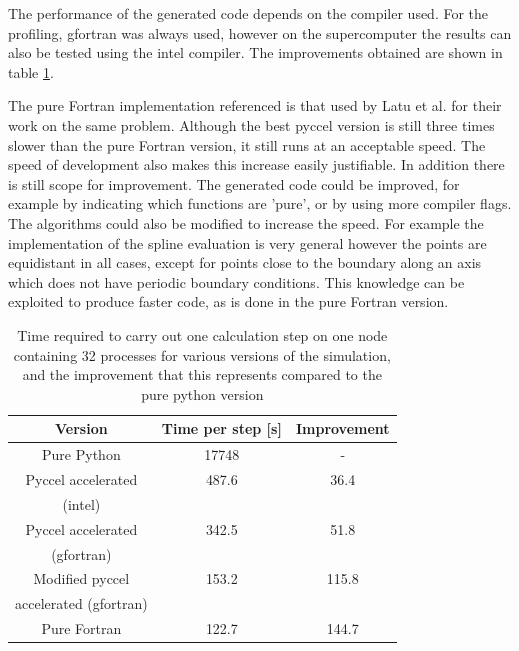 The performance of the generated code depends on the compiler used. For the profiling, gfortran was always used, however on the supercomputer the results can also be tested using the intel compiler. The improvements obtained are shown in table \ref{tab::timings}.

The pure Fortran implementation referenced is that used by Latu et al.\cite{YamanPaper} for their work on the same problem. Although the best pyccel version is still three times slower than the pure Fortran version, it still runs at an acceptable speed. The speed of development also makes this increase easily justifiable. In addition there is still scope for improvement. The generated code could be improved, for example by indicating which functions are 'pure', or by using more compiler flags. The algorithms could also be modified to increase the speed. For example the implementation of the spline evaluation is very general however the points are equidistant in all cases, except for points close to the boundary along an axis which does not have periodic boundary conditions. This knowledge can be exploited to produce faster code, as is done in the pure Fortran version.

\begin{table}[H]
\centering
 \begin{tabular}{|c|c|c|}
  \hline
  Version & Time per step [s] & Improvement\\
  \hline
  Pure Python & 17748\footnotemark & - \\
  \hline
  Pyccel accelerated & 487.6 & 36.4 \\
  (intel) & & \\
  \hline
  Pyccel accelerated & 342.5 & 51.8\\
  (gfortran) & & \\
  \hline
  Modified pyccel & 153.2\footnotemark & 115.8 \\
  accelerated (gfortran) & & \\
  \hline
  Pure Fortran & 122.7 & 144.7\\
  \hline
 \end{tabular}
\caption{\label{tab::timings} Time required to carry out one calculation step on one node containing 32 processes for various versions of the simulation, and the improvement that this represents compared to the pure python version}
\end{table}

